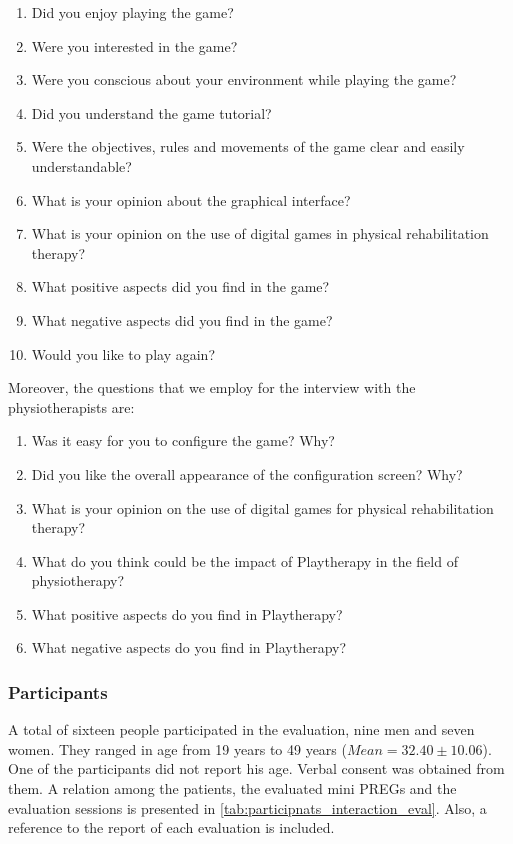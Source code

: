 \begin{enumerate}
    \item Did you enjoy playing the game?
    \item Were you interested in the game?
    \item Were you conscious about your environment while playing the game?
    \item Did you understand the game tutorial?
    \item Were the objectives, rules and movements of the game clear and easily understandable?
    \item What is your opinion about the graphical interface?
    \item What is your opinion on the use of digital games in physical rehabilitation therapy?
    \item What positive aspects did you find in the game?
    \item What negative aspects did you find in the game?
    \item Would you like to play again?
\end{enumerate}

Moreover, the questions that we employ for the interview with the physiotherapists are: 

\begin{enumerate}
    \item Was it easy for you to configure the game? Why?
    \item Did you like the overall appearance of the configuration screen? Why?
    \item What is your opinion on the use of digital games for physical rehabilitation therapy?
    \item What do you think could be the impact of Playtherapy in the field of physiotherapy?
    \item What positive aspects do you find in Playtherapy?
    \item What negative aspects do you find in Playtherapy?
\end{enumerate}

\subsubsection{Participants}
\label{sec:eval_int_eff_participants}

A total of sixteen people participated in the evaluation, nine men and seven women. They ranged in age from 19 years to 49 years ($Mean = 32.40 \pm10.06$). One of the participants did not report his age. Verbal consent was obtained from them. A relation among the patients, the evaluated mini \acp{PREG} and the evaluation sessions is presented in \autoref{tab:participnats_interaction_eval}. Also, a reference to the report of each evaluation is included.

